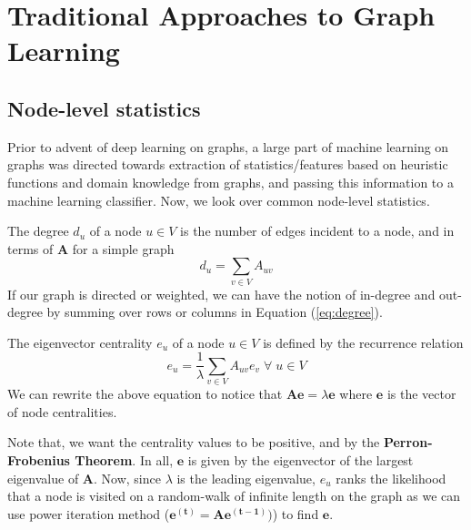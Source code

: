 \section{Traditional Approaches to Graph Learning}
\subsection{Node-level statistics}
Prior to advent of deep learning on graphs, a large part of machine learning on graphs was directed towards extraction of statistics/features based on heuristic functions and domain knowledge from graphs, and passing this information to a machine learning classifier. Now, we look over common node-level statistics.
\begin{definition}
The degree $d_u$ of a node $u \in V$ is the number of edges incident to a node, and in terms of $\mathbf{A}$ for a simple graph
\begin{equation} \label{eq:degree}
	d_u = \sum_{v \in V} A_{uv}
\end{equation}
If our graph is directed or weighted, we can have the notion of in-degree and out-degree by summing over rows or columns in Equation (\ref{eq:degree}).
\end{definition}
\begin{definition}
The eigenvector centrality $e_u$ of a node $u \in V$ is defined by the recurrence relation
\begin{equation}
	e_u = \dfrac{1}{\lambda} \sum_{v\in V} A_{uv}e_v \; \forall \; u \in V
\end{equation}	
We can rewrite the above equation to notice that $\mathbf{A}\mathbf{e} = \lambda \mathbf{e}$ where $\mathbf{e}$ is the vector of node centralities.
\end{definition}
Note that, we want the centrality values to be positive, and by the \textbf{Perron-Frobenius Theorem}. 
In all, $\mathbf{e}$ is given by the eigenvector of the largest eigenvalue of $\mathbf{A}$. 
Now, since $\lambda$ is the leading eigenvalue, $e_u$ ranks the likelihood that a node is visited on a random-walk of infinite length on the graph as we can use power iteration method ($\mathbf{e^{(t)}} = \mathbf{A}\mathbf{e^{(t-1)}})$) to find $\mathbf{e}$. \\
